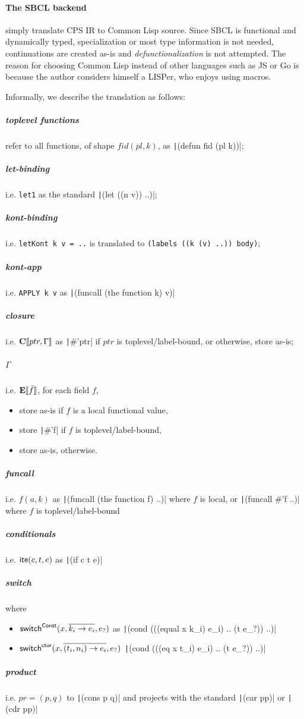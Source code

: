 \documentclass[a4paper, 11pt]{article}
\theoremstyle{remark}\newtheorem*{remark}{Remark}
\theoremstyle{definition}\newtheorem*{definition}{Definition}
\begin{document}
\paragraph{The SBCL backend} simply translate CPS IR to Common Lisp source.
Since SBCL is functional and dynamically typed, specialization or most type information is not needed,
continuations are created as-is and
\emph{defunctionalization} is not attempted.
The reason
for choosing Common Lisp
instead of other languages such as JS or Go is because the author considers himself a LISPer,
who enjoys using macros.

Informally, we describe the translation as follows:
\subparagraph*{toplevel functions} refer to all functions, of shape $fid(pl, k)$, as
\texttt|(defun fid (pl k))|;
\subparagraph*{let-binding} i.e. \texttt{let1} as the standard \texttt|(let ((n v)) ..)|;
\subparagraph*{kont-binding} i.e. \texttt{letKont k v = ..} is translated to \texttt{(labels ((k (v) ..)) body)};
\subparagraph*{kont-app} i.e. \texttt{APPLY k v} as \texttt|(funcall (the function k) v)|
\subparagraph*{closure} i.e. $\mathbf{C}\llbracket ptr, \Gamma \rrbracket$ as \texttt|#'ptr| if $ptr$ is
toplevel/label-bound, or otherwise, store as-is;
\subparagraph*{$\Gamma$} i.e. $\mathbf{E}\llbracket \bar{f} \rrbracket$, for each field $f$,
\begin{itemize}
\item store as-is if $f$ is a local functional value,
  \item store \texttt|#'f| if $f$ is toplevel/label-bound,
\item store as-is, otherwise.
\end{itemize}
\subparagraph*{funcall} i.e. $f(a, k)$ as \texttt|(funcall (the function f) ..)| where $f$ is local, or \texttt|(funcall #'f ..)| where $f$ is toplevel/label-bound
\subparagraph*{conditionals} i.e. $\mathsf{ite}(c,t,e)$ as \texttt|(if c t e)|
\subparagraph*{switch} where
\begin{itemize}
\item $\mathsf{switch}^{\mathsf{Const}}(x, \overline{k_i \to e_i}, e_?)$ as
  \texttt|(cond (((equal x k_i) e_i) .. (t e_?)) ..)|
\item $\mathsf{switch}^{\mathsf{ctor}}(x, \overline{(t_i, n_i) \to e_i}, e_?)$
  \texttt|(cond (((eq x t_i) e_i) .. (t e_?)) ..)|
\end{itemize}
\subparagraph*{product} i.e. $pr = (p, q)$ to \texttt|(cons p q)|
and projects with the standard \texttt|(car pp)| or \texttt|(cdr pp)|
\end{document}
